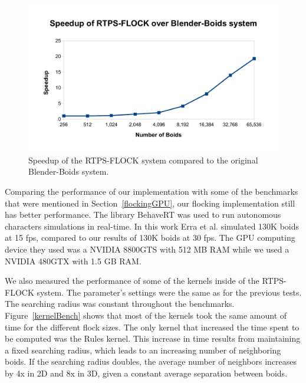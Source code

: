 \begin{figure}[htbp]
\begin{center}
\includegraphics[scale=0.7]{figures/speedup.pdf}
\caption{Speedup of the RTPS-FLOCK system compared to the original Blender-Boids system.}
\label{speedup}
\end{center}
\end{figure}

Comparing the performance of our implementation with some of the benchmarks that were mentioned in Section~\ref{flockingGPU}, our flocking implementation still has better performance. The library BehaveRT was used to run autonomous characters simulations in real-time. 
In this work Erra et al.\cite{BehaveRT} simulated 130K boids at 15 fps, compared to our results of 130K boids at 30 fps. The GPU computing device they used was a NVIDIA 8800GTS with 512 MB RAM while we used a NVIDIA 480GTX with 1.5 GB RAM. 

We also measured the performance of some of the kernels inside of the RTPS-FLOCK system. The parameter's settings were the same as for the previous tests. The searching radius was constant throughout the benchmarks. Figure~\ref{kernelBench} shows that most of the kernels took the same amount of time for the different flock sizes. The only kernel that increased the time spent to be computed was the Rules kernel. This increase in time results from maintaining a fixed searching radius, which leads to an increasing number of neighboring boids. If the searching radius doubles, the average number of neighbors increases by 4x in 2D and 8x in 3D, given a constant average separation between boids. 

